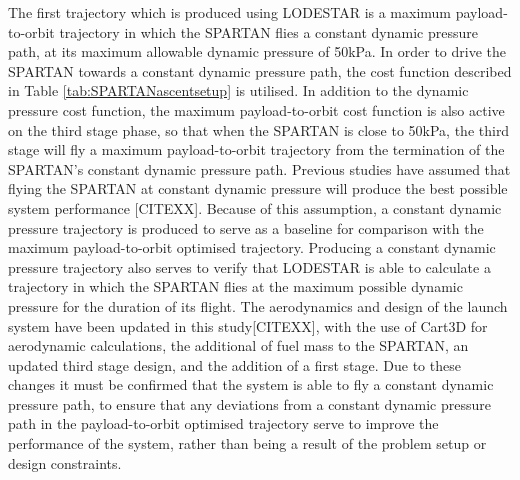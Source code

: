 The first trajectory which is produced using LODESTAR is a maximum payload-to-orbit trajectory in which the SPARTAN flies a constant dynamic pressure path, at its maximum allowable dynamic pressure of 50kPa. In order to drive the SPARTAN towards a constant dynamic pressure path, the cost function described in Table \ref{tab:SPARTANascentsetup} is utilised. In addition to the dynamic pressure cost function, the maximum payload-to-orbit cost function is also active on the third stage phase, so that when the SPARTAN is close to 50kPa, the third stage will fly a maximum payload-to-orbit trajectory from the termination of the SPARTAN's constant dynamic pressure path.
Previous studies have assumed that flying the SPARTAN at constant dynamic pressure will produce the best possible system performance [CITEXX]. Because of this assumption, a constant dynamic pressure trajectory is produced to serve as a baseline for comparison with the maximum payload-to-orbit optimised trajectory. Producing a constant dynamic pressure trajectory also serves to verify that LODESTAR is able to calculate a trajectory in which the SPARTAN flies at the maximum possible dynamic pressure for the duration of its flight. 
The aerodynamics and design of the launch system have been updated in this study[CITEXX], with the use of Cart3D for aerodynamic calculations, the additional of fuel mass to the SPARTAN, an updated third stage design, and the addition of a first stage. Due to these changes it must be confirmed that the system is able to fly a constant dynamic pressure path, to ensure that any deviations from a constant dynamic pressure path in the payload-to-orbit optimised trajectory serve to improve the performance of the system, rather than being a result of the problem setup or design constraints. 

